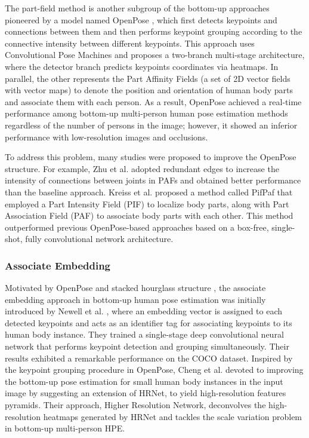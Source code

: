 The part-field method is another subgroup of the bottom-up approaches pioneered by a model named OpenPose \cite{cao_realtime_2017}, which first detects keypoints and connections between them and then performs keypoint grouping according to the connective intensity between different keypoints. This approach uses Convolutional Pose Machines \cite{wei_convolutional_2016} and proposes a two-branch multi-stage architecture, where the detector branch predicts keypoints coordinates via heatmaps. In parallel, the other represents the Part Affinity Fields (a set of 2D vector fields with vector maps) to denote the position and orientation of human body parts and associate them with each person. As a result, OpenPose achieved a real-time performance among bottom-up multi-person human pose estimation methods regardless of the number of persons in the image; however, it showed an inferior performance with low-resolution images and occlusions. 

To address this problem, many studies were proposed to improve the OpenPose structure. For example, Zhu et al. \cite{zhu_multi-person_nodate} adopted redundant edges to increase the intensity of connections between joints in PAFs and obtained better performance than the baseline approach. Kreiss et al. \cite{kreiss_pifpaf_2019} proposed a method called PifPaf that employed a Part Intensity Field (PIF) to localize body parts, along with Part Association Field (PAF) to associate body parts with each other. This method outperformed previous OpenPose-based approaches based on a box-free, single-shot, fully convolutional network architecture. 

\subsubsection{Associate Embedding} 

Motivated by OpenPose \cite{cao_realtime_2017} and stacked hourglass structure \cite{newell_stacked_2016}, the associate embedding approach in bottom-up human pose estimation was initially introduced by Newell et al. \cite{newell_associative_2017}, where an embedding vector is assigned to each detected keypoints and acts as an identifier tag for associating keypoints to its human body instance. They trained a single-stage deep convolutional neural network that performs keypoint detection and grouping simultaneously. Their results exhibited a remarkable performance on the COCO dataset. Inspired by the keypoint grouping procedure in OpenPose, Cheng et al. \cite{cheng_higherhrnet_2020} devoted to improving the bottom-up pose estimation for small human body instances in the input image by suggesting an extension of HRNet, to yield high-resolution features pyramids. Their approach, Higher Resolution Network, deconvolves the high-resolution heatmaps generated by HRNet and tackles the scale variation problem in bottom-up multi-person HPE. 

